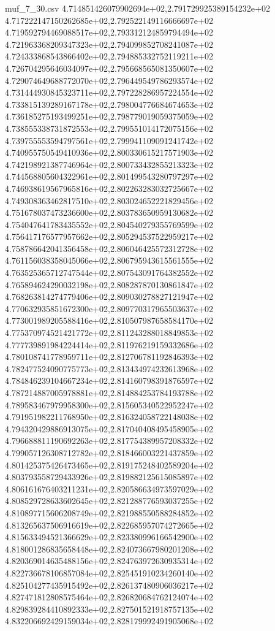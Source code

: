 \begin{filecontents*}{muf_7_30.csv}
4.714851426079902694e+02,2.791729925389154232e+02
4.717222147150262685e+02,2.792522149116666697e+02
4.719592794469088517e+02,2.793312124859794494e+02
4.721963368209347323e+02,2.794099852708241087e+02
4.724333868543866402e+02,2.794885332752119211e+02
4.726704295646034097e+02,2.795668565081350607e+02
4.729074649688772070e+02,2.796449549786293574e+02
4.731444930845323711e+02,2.797228286957224554e+02
4.733815139289167178e+02,2.798004776684674653e+02
4.736185275193499251e+02,2.798779019059375059e+02
4.738555338731872553e+02,2.799551014172075156e+02
4.739755553594797561e+02,2.799941109091241742e+02
4.740955750549410936e+02,2.800330615217571903e+02
4.742198921387746964e+02,2.800733432855213323e+02
4.744568805604322961e+02,2.801499543280797297e+02
4.746938619567965816e+02,2.802263283032725667e+02
4.749308363462817510e+02,2.803024652221829456e+02
4.751678037473236600e+02,2.803783650959130682e+02
4.754047641783435552e+02,2.804540279355769599e+02
4.756417176577957662e+02,2.805294537522959217e+02
4.758786642041356458e+02,2.806046425572312728e+02
4.761156038358045066e+02,2.806795943615561555e+02
4.763525365712747544e+02,2.807543091764382552e+02
4.765894624290032198e+02,2.808287870130861847e+02
4.768263814274779406e+02,2.809030278827121947e+02
4.770632935851672300e+02,2.809770317965503637e+02
4.773001989205588416e+02,2.810507987658584170e+02
4.775370974521421772e+02,2.811243288018849853e+02
4.777739891984224414e+02,2.811976219159332686e+02
4.780108741778959711e+02,2.812706781192846393e+02
4.782477524090775773e+02,2.813434974232613968e+02
4.784846239104667234e+02,2.814160798391876597e+02
4.787214887005978881e+02,2.814884253784193788e+02
4.789583467979958300e+02,2.815605340522952247e+02
4.791951982211768950e+02,2.816324058722148038e+02
4.794320429886913075e+02,2.817040408495458905e+02
4.796688811190692263e+02,2.817754389957208332e+02
4.799057126308712782e+02,2.818466003221437859e+02
4.801425375426473465e+02,2.819175248402589204e+02
4.803793558729433926e+02,2.819882125615085897e+02
4.806161676403211231e+02,2.820586634973597029e+02
4.808529728633602645e+02,2.821288776593037255e+02
4.810897715606208749e+02,2.821988550588284852e+02
4.813265637506916619e+02,2.822685957074272665e+02
4.815633494521366629e+02,2.823380996166542900e+02
4.818001286835658448e+02,2.824073667980201208e+02
4.820369014635488156e+02,2.824763972630935314e+02
4.822736678106857084e+02,2.825451910234260140e+02
4.825104277435915492e+02,2.826137480906036217e+02
4.827471812808575464e+02,2.826820684762124074e+02
4.829839284410892333e+02,2.827501521918757135e+02
4.832206692429159034e+02,2.828179992491905068e+02

\end{filecontents*}
